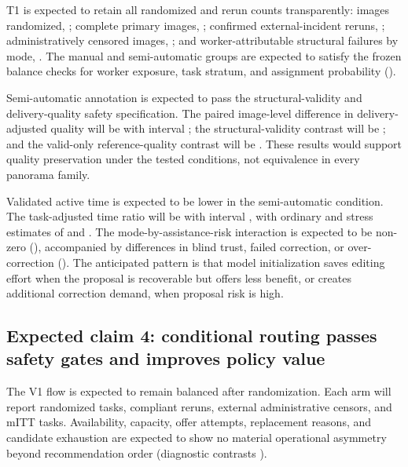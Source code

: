 \expectedresult{} T1 is expected to retain all randomized and rerun counts transparently: images randomized, \tbddata{}; complete primary images, \tbddata{}; confirmed external-incident reruns, \tbddata{}; administratively censored images, \tbddata{}; and worker-attributable structural failures by mode, \tbddata{}. The manual and semi-automatic groups are expected to satisfy the frozen balance checks for worker exposure, task stratum, and assignment probability (\tbddata{}).

\expectedresult{} Semi-automatic annotation is expected to pass the structural-validity and delivery-quality safety specification. The paired image-level difference in delivery-adjusted quality will be \tbddata{} with interval \tbddata{}; the structural-validity contrast will be \tbddata{}; and the valid-only reference-quality contrast will be \tbddata{}. These results would support quality preservation under the tested conditions, not equivalence in every panorama family.

\expectedresult{} Validated active time is expected to be lower in the semi-automatic condition. The task-adjusted time ratio will be \tbddata{} with interval \tbddata{}, with ordinary and stress estimates of \tbddata{} and \tbddata{}. The mode-by-assistance-risk interaction is expected to be non-zero (\tbddata{}), accompanied by differences in blind trust, failed correction, or over-correction (\tbddata{}). The anticipated pattern is that model initialization saves editing effort when the proposal is recoverable but offers less benefit, or creates additional correction demand, when proposal risk is high.

\subsection{Expected claim 4: conditional routing passes safety gates and improves policy value \expectedresult{}}


\expectedresult{} The V1 flow is expected to remain balanced after randomization. Each arm will report \tbddata{} randomized tasks, \tbddata{} compliant reruns, \tbddata{} external administrative censors, and \tbddata{} mITT tasks. Availability, capacity, offer attempts, replacement reasons, and candidate exhaustion are expected to show no material operational asymmetry beyond recommendation order (diagnostic contrasts \tbddata{}).

